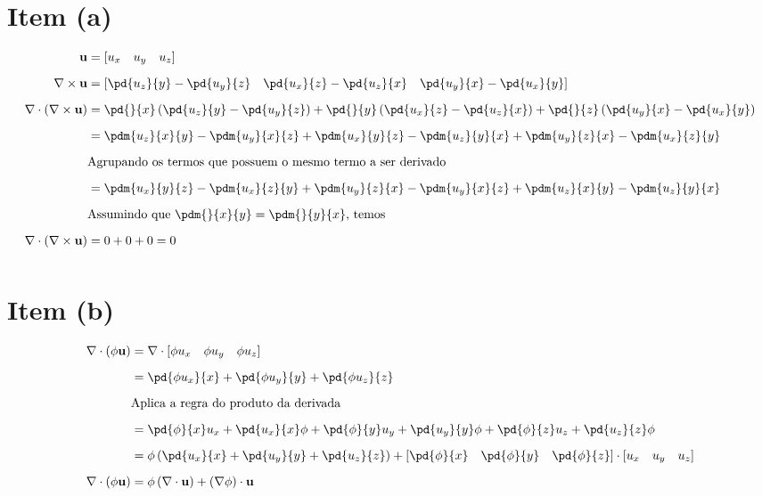 \section{Item (a)}

\begin{footnotesize}
\begin{align*}
\mathbf{u}
&=
\left[ u_x \quad u_y \quad u_z \right]
\\[6pt]
\nabla \times \mathbf{u}
&= \left[ 
    \pd{u_z}{y} - \pd{u_y}{z} \quad
     \pd{u_x}{z} - \pd{u_z}{x} \quad
     \pd{u_y}{x} - \pd{u_x}{y}
\right]
\\[6pt]
\nabla \cdot \left( \nabla \times \mathbf{u} \right) 
&= 
\pd{}{x} \left(  \pd{u_z}{y} - \pd{u_y}{z}  \right) +
    \pd{}{y} \left( \pd{u_x}{z} - \pd{u_z}{x} \right) +
    \pd{}{z} \left( \pd{u_y}{x} - \pd{u_x}{y} \right)
\\[6pt]
&= 
    \pdm{u_z}{x}{y} - \pdm{u_y}{x}{z} +
    \pdm{u_x}{y}{z} - \pdm{u_z}{y}{x} +
    \pdm{u_y}{z}{x} - \pdm{u_x}{z}{y}
\\[6pt]
& \text{Agrupando os termos que possuem o mesmo termo a ser derivado}
\\[6pt]
&= 
\pdm{u_x}{y}{z} - \pdm{u_x}{z}{y} + \pdm{u_y}{z}{x} - \pdm{u_y}{x}{z} + \pdm{u_z}{x}{y} - \pdm{u_z}{y}{x}  
\\[6pt]
& \text{Assumindo que $\pdm{}{x}{y} = \pdm{}{y}{x}$, temos}
\\[6pt]
\nabla \cdot \left( \nabla \times \mathbf{u} \right)  &= 0 + 0 + 0 = 0
\\[6pt]
\end{align*}
\end{footnotesize}

\section{Item (b)}

\begin{footnotesize}
\begin{align*}
\nabla \cdot \left( \phi \mathbf{u} \right)
&=
\nabla \cdot \left[ \phi u_x \quad \phi u_y \quad \phi u_z \right]
\\[6pt]
&=\pd{\phi u_x}{x} + \pd{\phi u_y}{y} + \pd{\phi u_z}{z}
\\[6pt]
& \text{Aplica a regra do produto da derivada}
\\[6pt]
&=\pd{\phi}{x}u_x + \pd{u_x}{x} \phi + \pd{\phi}{y}u_y + \pd{u_y}{y} \phi + \pd{\phi}{z}u_z + \pd{u_z}{z} \phi 
\\[6pt]
&= \phi \left( \pd{u_x}{x} + \pd{u_y}{y} + \pd{u_z}{z} \right) + \left[ \pd{\phi}{x} \quad \pd{\phi}{y} \quad \pd{\phi}{z} \right] \cdot \left[ u_x \quad u_y \quad u_z \right]
\\[6pt]
\nabla \cdot \left( \phi \mathbf{u} \right)
&= \phi \left( \nabla \cdot \mathbf{u} \right) + \left( \nabla \phi \right) \cdot \mathbf{u}
\end{align*}
\end{footnotesize}


